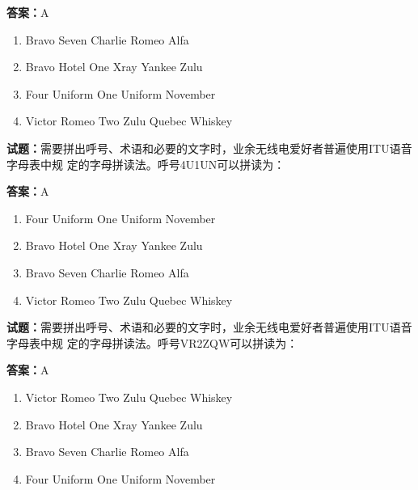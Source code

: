 \documentclass{ctexbook}
\begin{document}
\textbf{答案：}A 

\begin{enumerate}[leftmargin=3em]
  \item Bravo Seven Charlie Romeo Alfa 

  \item Bravo Hotel One Xray Yankee Zulu 

  \item Four Uniform One Uniform November 

  \item Victor Romeo Two Zulu Quebec Whiskey 

\end{enumerate}





\vspace{1em}

\textbf{试题：}需要拼出呼号、术语和必要的文字时，业余无线电爱好者普遍使用ITU语音字母表中规
定的字母拼读法。呼号4U1UN可以拼读为： 

\textbf{答案：}A 

\begin{enumerate}[leftmargin=3em]
  \item Four Uniform One Uniform November 

  \item Bravo Hotel One Xray Yankee Zulu 

  \item Bravo Seven Charlie Romeo Alfa 


  \item Victor Romeo Two Zulu Quebec Whiskey 

\end{enumerate}





\vspace{1em}

\textbf{试题：}需要拼出呼号、术语和必要的文字时，业余无线电爱好者普遍使用ITU语音字母表中规
定的字母拼读法。呼号VR2ZQW可以拼读为： 

\textbf{答案：}A 

\begin{enumerate}[leftmargin=3em]
  \item Victor Romeo Two Zulu Quebec Whiskey 

  \item Bravo Hotel One Xray Yankee Zulu 

  \item Bravo Seven Charlie Romeo Alfa 

  \item Four Uniform One Uniform November 

\end{enumerate}
\end{document}
